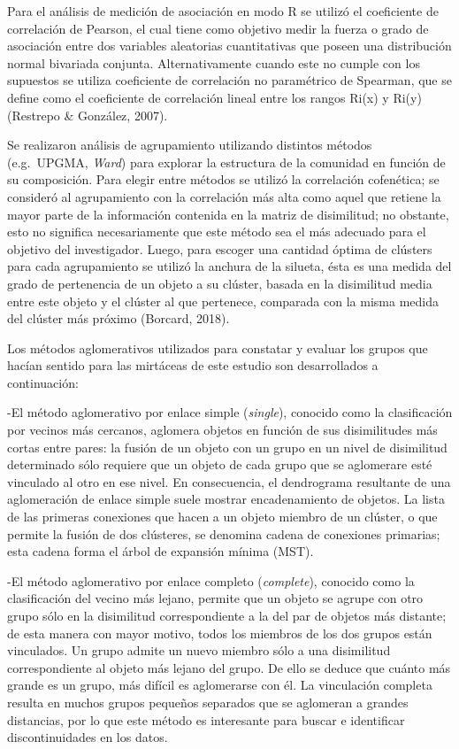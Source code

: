 \documentclass[11pt,]{article}
\begin{document}
Para el análisis de medición de asociación en modo R se utilizó el
coeficiente de correlación de Pearson, el cual tiene como objetivo medir
la fuerza o grado de asociación entre dos variables aleatorias
cuantitativas que poseen una distribución normal bivariada conjunta.
Alternativamente cuando este no cumple con los supuestos se utiliza
coeficiente de correlación no paramétrico de Spearman, que se define
como el coeficiente de correlación lineal entre los rangos Ri(x) y Ri(y)
(Restrepo \& González, 2007).

Se realizaron análisis de agrupamiento utilizando distintos métodos
(e.g.~UPGMA, \emph{Ward}) para explorar la estructura de la comunidad en
función de su composición. Para elegir entre métodos se utilizó la
correlación cofenética; se consideró al agrupamiento con la correlación
más alta como aquel que retiene la mayor parte de la información
contenida en la matriz de disimilitud; no obstante, esto no significa
necesariamente que este método sea el más adecuado para el objetivo del
investigador. Luego, para escoger una cantidad óptima de clústers para
cada agrupamiento se utilizó la anchura de la silueta, ésta es una
medida del grado de pertenencia de un objeto a su clúster, basada en la
disimilitud media entre este objeto y el clúster al que pertenece,
comparada con la misma medida del clúster más próximo (Borcard, 2018).

Los métodos aglomerativos utilizados para constatar y evaluar los grupos
que hacían sentido para las mirtáceas de este estudio son desarrollados
a continuación:

-El método aglomerativo por enlace simple (\emph{single}), conocido como
la clasificación por vecinos más cercanos, aglomera objetos en función
de sus disimilitudes más cortas entre pares: la fusión de un objeto con
un grupo en un nivel de disimilitud determinado sólo requiere que un
objeto de cada grupo que se aglomerare esté vinculado al otro en ese
nivel. En consecuencia, el dendrograma resultante de una aglomeración de
enlace simple suele mostrar encadenamiento de objetos. La lista de las
primeras conexiones que hacen a un objeto miembro de un clúster, o que
permite la fusión de dos clústeres, se denomina cadena de conexiones
primarias; esta cadena forma el árbol de expansión mínima (MST).

-El método aglomerativo por enlace completo (\emph{complete}), conocido
como la clasificación del vecino más lejano, permite que un objeto se
agrupe con otro grupo sólo en la disimilitud correspondiente a la del
par de objetos más distante; de esta manera con mayor motivo, todos los
miembros de los dos grupos están vinculados. Un grupo admite un nuevo
miembro sólo a una disimilitud correspondiente al objeto más lejano del
grupo. De ello se deduce que cuánto más grande es un grupo, más difícil
es aglomerarse con él. La vinculación completa resulta en muchos grupos
pequeños separados que se aglomeran a grandes distancias, por lo que
este método es interesante para buscar e identificar discontinuidades en
los datos.
\end{document}
